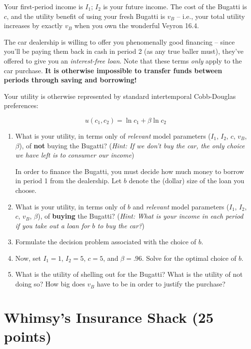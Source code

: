 \documentclass{article}
\begin{document}
Your first-period income is $I_1$; $I_2$ is your future income. The cost of the Bugatti is $c$, and the utility benefit of using your fresh Bugatti is $v_B$ -- i.e., your total utility increases by exactly $v_B$ when you own the wonderful Veyron 16.4.

The car dealership is willing to offer you phenomenally good financing -- since you'll be paying them back in cash in period 2 (as any true baller must), they've offered to give you an \textit{interest-free loan}. Note that these terms \textit{only} apply to the car purchase. \textbf{It is otherwise impossible to transfer funds between periods through saving and borrowing!}

Your utility is otherwise represented by standard intertemporal Cobb-Douglas preferences:

\[ u(c_1, c_2) = \ln c_1 + \beta \ln c_2 \]

\begin{enumerate}
\item What is your utility, in terms only of \textit{relevant} model parameters ($I_1$, $I_2$, $c$, $v_B$, $\beta$), of \textbf{not} buying the Bugatti? (\textit{Hint: If we don't buy the car, the only choice we have left is to consumer our income})

In order to finance the Bugatti, you must decide how much money to borrow in period 1 from the dealership. Let $b$ denote the (dollar) size of the loan you choose.

\item What is your utility, in terms only of $b$ and \textit{relevant} model parameters ($I_1$, $I_2$, $c$, $v_B$, $\beta$), of \textbf{buying} the Bugatti? (\textit{Hint: What is your income in each period if you take out a loan for $b$ to buy the car?})

\item Formulate the decision problem associated with the choice of $b$.

\item Now, set $I_1 = 1$, $I_2 = 5$, $c = 5$, and $\beta = .96$. Solve for the optimal choice of $b$.

\item What is the utility of shelling out for the Bugatti? What is the utility of not doing so? How big does $v_B$ have to be in order to justify the purchase?
\end{enumerate}

\section*{Whimsy's Insurance Shack (25 points)}
\end{document}
